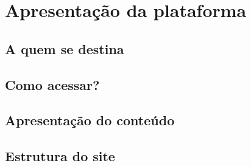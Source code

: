 \captionsetup{justification=raggedright, singlelinecheck=false}

\chapter{Apresentação da plataforma}

\lipsum[1-3]

\section{A quem se destina}
\lipsum[1-3]


\section{Como acessar?}
\lipsum[1-3]

\section{Apresentação do conteúdo}
\lipsum[1-3]

\section{Estrutura do site }




